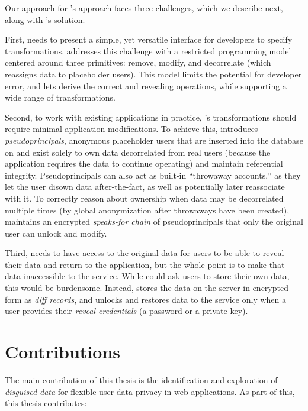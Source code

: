 %
%
Our approach for \sys's approach faces three challenges, which we describe next,
along with \sys's solution.

%
First, \sys needs to present a simple, yet versatile interface for developers to
specify \xxing transformations.
%
\sys addresses this challenge with a restricted programming model centered
around three primitives: remove, modify, and decorrelate (which reassigns data
to placeholder users).
%
This model limits the potential for developer error, and lets \sys derive the
correct \xxing and revealing operations, while supporting a wide range of
transformations.
%

%
Second, to work with existing applications in practice, \sys's \xxing
transformations should require minimal application modifications.
%
To achieve this, \sys introduces \emph{pseudoprincipals}, anonymous placeholder
users that are inserted into the database on \xxing and exist solely to own data
decorrelated from real users (\eg because the application requires the data to
continue operating) and maintain referential integrity.
%
Pseudoprincipals can also act as built-in ``throwaway accounts,'' as they let
the user disown data after-the-fact, as well as potentially later reassociate
with it.
%
To correctly reason about ownership when data may be decorrelated multiple times
(\eg by global anonymization after throwaways have been created), \sys maintains
an encrypted \emph{speaks-for chain} of pseudoprincipals that only the original user
can unlock and modify.
%

%
Third, \sys needs to have access to the original data for users to be able to
reveal their data and return to the application, but the whole point is to make
that data inaccessible to the service.
%
While \sys could ask users to store their own \xxed data, this would be
burdensome.
%
Instead, \sys stores the \xxed data on the server in encrypted form as
\emph{diff records}, and unlocks
and restores data to the service only when a user provides their \emph{reveal
credentials} (\eg a password or a private key).

%
\section{Contributions}
%
The main contribution of this thesis is the identification and exploration of
\emph{disguised data} for flexible user data privacy in web applications. As
part of this, this thesis contributes:

